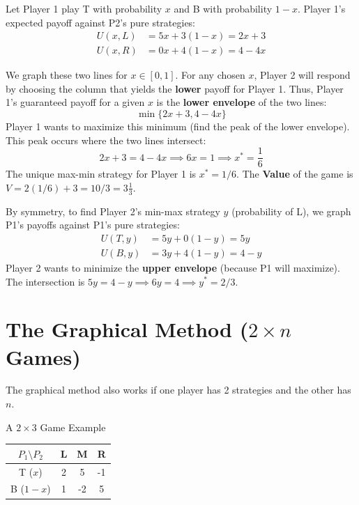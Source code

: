 \documentclass[12pt, a4paper]{article}
\begin{document}
Let Player 1 play T with probability $x$ and B with probability $1-x$.
Player 1's expected payoff against P2's pure strategies:
\begin{align*}
  U(x, L) &= 5x + 3(1-x) = 2x + 3 \\
  U(x, R) &= 0x + 4(1-x) = 4 - 4x
\end{align*}

We graph these two lines for $x \in [0,1]$. For any chosen $x$, Player 2 will respond by choosing the column that yields the \textbf{lower} payoff for Player 1. Thus, Player 1's guaranteed payoff for a given $x$ is the \textbf{lower envelope} of the two lines:
\[
  \min \{2x + 3, 4 - 4x\}
\]
Player 1 wants to maximize this minimum (find the peak of the lower envelope). This peak occurs where the two lines intersect:
\[
  2x + 3 = 4 - 4x \implies 6x = 1 \implies x^* = \frac{1}{6}
\]
The unique max-min strategy for Player 1 is $x^* = 1/6$.
The \textbf{Value} of the game is $V = 2(1/6) + 3 = 10/3 = 3\frac{1}{3}$.

\vspace{0.3cm}
By symmetry, to find Player 2's min-max strategy $y$ (probability of L), we graph P1's payoffs against P1's pure strategies:
\begin{align*}
  U(T, y) &= 5y + 0(1-y) = 5y \\
  U(B, y) &= 3y + 4(1-y) = 4 - y
\end{align*}
Player 2 wants to minimize the \textbf{upper envelope} (because P1 will maximize).
The intersection is $5y = 4 - y \implies 6y = 4 \implies y^* = 2/3$.

\section{The Graphical Method ($2 \times n$ Games)}

The graphical method also works if one player has 2 strategies and the other has $n$.

\begin{exbox}{A $2 \times 3$ Game Example}
  \begin{center}
  \renewcommand{\arraystretch}{1.3}
  \begin{tabular}{c|ccc}
    $P_1 \setminus P_2$ & L & M & R \\
    \hline
    T ($x$) & 2 & 5 & -1 \\
    B ($1-x$) & 1 & -2 & 5 \\
  \end{tabular}
  \end{center}
\end{exbox}
\end{document}
